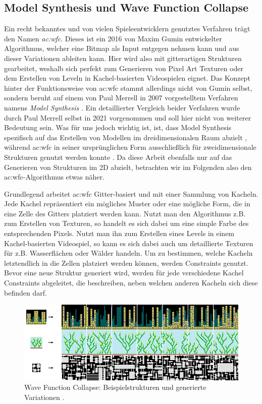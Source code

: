 \subsection{Model Synthesis und Wave Function Collapse}
Ein recht bekanntes und von vielen Spieleentwicklern genutztes Verfahren trägt den Namen \textit{\gls{ac:wfc}}. Dieses ist ein 2016 von
Maxim Gumin entwickelter Algorithmus, welcher eine Bitmap als Input entgegen nehmen kann und aus dieser Variationen ableiten kann. Hier wird also
mit gitterartigen Strukturen gearbeitet, weshalb sich  perfekt zum Generieren von Pixel Art Texturen oder dem Erstellen von
Leveln in Kachel-basierten Videospielen eignet. \cite{45_gumin} Das Konzept hinter der Funktionsweise von \gls{ac:wfc} stammt allerdings
nicht von Gumin selbst, sondern beruht auf einem von Paul Merrell in 2007 vorgestelltem Verfahren namens \textit{Model Synthesis} \cite{20_merrell}.
Ein detaillierter Vergleich beider Verfahren wurde durch Paul Merrell selbst in 2021 vorgenommen \cite{46_merrell} und soll hier nicht von weiterer
Bedeutung sein. Was für uns jedoch wichtig ist, ist, dass Model Synthesis spezifisch auf das Erstellen von Modellen im dreidimensionalen Raum
abzielt \cite{20_merrell}, während \gls{ac:wfc} in seiner ursprünglichen Form ausschließlich für zweidimensionale Strukturen genutzt werden
konnte \cite{45_gumin}\cite{46_merrell}. Da diese Arbeit ebenfalls nur auf das Generieren von Strukturen im 2D abzielt, betrachten wir im Folgenden
also den \gls{ac:wfc}-Algorithmus etwas näher.

Grundlegend arbeitet \gls{ac:wfc} Gitter-basiert und mit einer Sammlung von Kacheln. Jede Kachel repräsentiert ein mögliches Muster oder eine mögliche
Form, die in eine Zelle des Gitters platziert werden kann. Nutzt man den Algorithmus z.B. zum Erstellen von Texturen, so handelt es sich dabei um eine
simple Farbe des entsprechenden Pixels. Nutzt man ihn zum Erstellen eines Levels in einem Kachel-basierten Videospiel, so kann es sich dabei auch um
detaillierte Texturen für z.B. Wasserflächen oder Wälder handeln. Um zu bestimmen, welche Kacheln letztendlich in die Zellen platziert werden können,
werden Constraints genutzt. Bevor eine neue Struktur generiert wird, werden für jede verschiedene Kachel Constraints abgeleitet, die beschreiben, neben
welchen anderen Kacheln sich diese befinden darf. \cite{45_gumin}

\begin{figure}[t]
    \centering
    \includegraphics[width=\imgWidth]{images/wfc.png}
    \caption{Wave Function Collapse: Beispielstrukturen und generierte Variationen \cite{45_gumin}.}
    \label{fig:wfc}
\end{figure}

